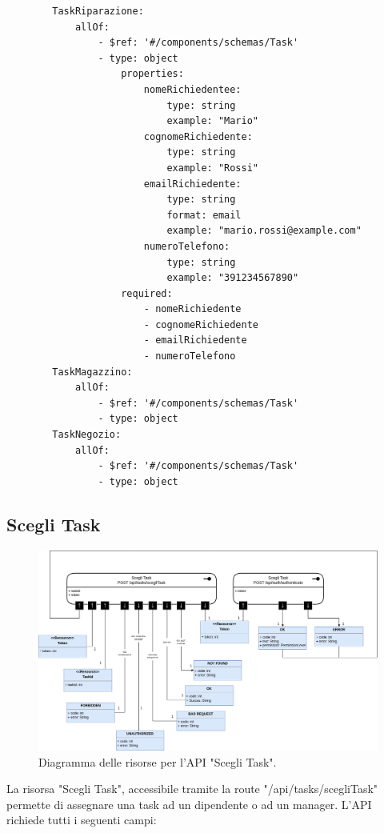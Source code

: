 \documentclass{report}
\begin{document}
\begin{verbatim}
	    TaskRiparazione:
	        allOf:
	            - $ref: '#/components/schemas/Task'
	            - type: object
	                properties:
	                    nomeRichiedentee:
	                        type: string
	                        example: "Mario"
	                    cognomeRichiedente:
	                        type: string
	                        example: "Rossi"
	                    emailRichiedente:
	                        type: string
	                        format: email
	                        example: "mario.rossi@example.com"
	                    numeroTelefono:
	                        type: string
	                        example: "391234567890"
	                required:
	                    - nomeRichiedente
	                    - cognomeRichiedente
	                    - emailRichiedente
	                    - numeroTelefono
	    TaskMagazzino:
	        allOf:
	            - $ref: '#/components/schemas/Task'
	            - type: object
	    TaskNegozio:
	        allOf:
	            - $ref: '#/components/schemas/Task'
	            - type: object
\end{verbatim}

\subsection*{Scegli Task}

\begin{figure}[H]
	\centering\includegraphics[width=1\textwidth]{images/scegli_task_model.png}
	Diagramma delle risorse per l'API "Scegli Task".
\end{figure}

La risorsa "Scegli Task", accessibile tramite la route "/api/tasks/scegliTask" permette di assegnare una task ad un dipendente o ad un manager. L'API richiede tutti i seguenti campi:
\end{document}
